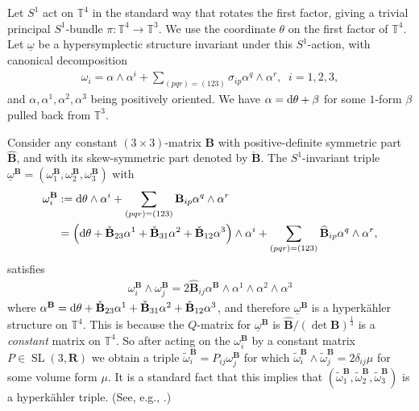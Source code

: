 \documentclass[11pt]{amsart}
\DeclareMathOperator{\SL}{SL}
\newcommand{\diff}{\text{\rm d}}
\theoremstyle{plain}
\theoremstyle{definition}
\theoremstyle{plain}
\theoremstyle{definition}
\numberwithin{equation}{section}
\numberwithin{theorem}{section}
\begin{document}
Let $S^1$ act on $\mathbb{T}^4$ in the standard way that rotates the first factor, giving a trivial principal $S^1$-bundle $\pi \colon \mathbb{T}^4 \rightarrow \mathbb{T}^3$. We use the coordinate $\theta$ on the first factor of $\mathbb{T}^4$. Let $\underline\omega$ be a hypersymplectic structure invariant under this $S^1$-action, with canonical decomposition 
    \begin{align}
    \label{canonical-decomposition-on-torus}
        \omega_i
        =
        \alpha\wedge \alpha^i + \sum_{(pqr)=(123)} \sigma_{ip}\alpha^q\wedge \alpha^r, \; \; i=1,2,3,
    \end{align}  
and $\alpha,\alpha^1,\alpha^2,\alpha^3$ being positively oriented.  We have $\alpha=\diff \theta+\beta$ for some $1$-form $\beta$ pulled back from $\mathbb{T}^3$.     

Consider any constant $(3\times 3)$-matrix $\mathbf{B}$ with positive-definite symmetric part $\widehat{\mathbf{B}}$, and with its skew-symmetric part denoted by $\check{\mathbf{B}}$. The $S^1$-invariant triple $\underline\omega^{\mathbf{B}}=\left(\omega_1^\mathbf{B}, \omega_2^\mathbf{B}, \omega_3^\mathbf{B}\right)$ with 
\begin{align}
\label{B-hyperkahler}
\omega_i^\mathbf{B}
& := 
\diff \theta \wedge \alpha^i 
+
\sum_{(pqr)=(123)}\mathbf{B}_{ip}\alpha^q\wedge\alpha^r\nonumber\\
& =
\left(\diff \theta+ \check{\mathbf{B}}_{23}\alpha^1 + \check{\mathbf{B}}_{31}\alpha^2 + \check{\mathbf{B}}_{12}\alpha^3\right)\wedge \alpha^i 
+ 
\sum_{(pqr)=(123)}\widehat{\mathbf{B}}_{ip}\alpha^q\wedge\alpha^r,
\end{align}
satisfies
\begin{align*}
    \omega_i^\mathbf{B}\wedge\omega_j^\mathbf{B}
    = 
    2\widehat{\mathbf{B}}_{ij}\alpha^\mathbf{B}\wedge\alpha^1\wedge\alpha^2\wedge\alpha^3
\end{align*}
where $\alpha^\mathbf{B}=\diff \theta+ \check{\mathbf{B}}_{23}\alpha^1 + \check{\mathbf{B}}_{31}\alpha^2 + \check{\mathbf{B}}_{12}\alpha^3$, and therefore $\underline\omega^\mathbf{B}$ is a hyperk\"ahler structure on $\mathbb{T}^4$. This is because the $Q$-matrix for $\underline\omega^\mathbf{B}$ is $\widehat{\mathbf{B}}/\left(\det \mathbf{B}\right)^\frac{1}{3}$ is a \emph{constant} matrix on $\mathbb{T}^4$. So after acting on the $\omega_i^{\mathbf{B}}$ by a constant matrix $P \in \SL(3,\mathbf{R})$ we obtain a triple $\tilde{\omega}_i^{\mathbf{B}} = P_{ij} \omega_j^{\mathbf{B}}$ for which $\tilde{\omega}_i^{\mathbf{B}} \wedge \tilde{\omega}_j^{\mathbf{B}} = 2\delta_{ij} \mu$ for some volume form $\mu$. It is a standard fact that this implies that $\left(\tilde{\omega}_{1}^{\mathbf{B}}, \tilde{\omega}_{2}^{\mathbf{B}}, \tilde{\omega}_{3}^{\mathbf{B}}\right)$ is a hyperk\"ahler triple. (See, e.g., \cite[Propositions 3.7 and 3.9]{FY}.)
\end{document}
